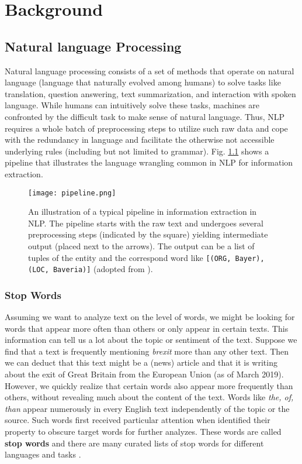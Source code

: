 \chapter{Background}

\section{Natural language Processing}
Natural language processing consists of a set of methods that operate on natural language (language that naturally evolved among humans) to solve tasks like translation, question answering, text summarization, and interaction with spoken language. While humans can intuitively solve these tasks, machines are confronted by the difficult task to make sense of natural language. Thus, NLP requires a whole batch of preprocessing steps to utilize such raw data and cope with the redundancy in language and facilitate the otherwise not accessible underlying rules (including but not limited to grammar). Fig. \ref{fig:pipeline} shows a pipeline that illustrates the language wrangling common in NLP for information extraction.

\begin{figure}[h!]
    \centering
    \texttt{[image: pipeline.png]}
    \caption{An illustration of a typical pipeline in information extraction in NLP. The pipeline starts with the raw text and undergoes several preprocessing steps (indicated by the square) yielding intermediate output (placed next to the arrows). The output can be a list of tuples of the entity and the correspond word like \texttt{[(ORG, \textquotesingle Bayer\textquotesingle), (LOC, \textquotesingle Baveria\textquotesingle)]} (adopted from \citep{Bird2009}).}
    \label{fig:pipeline}
\end{figure}

\subsection{Stop Words}
Assuming we want to analyze text on the level of words, we might be looking for
words that appear more often than others or only appear in certain texts.
This information can tell us a lot about the topic or sentiment of the text.
Suppose we find that a text is frequently mentioning \textit{brexit} more than any other text.
Then we can deduct that this text might be a (news) article and that it is writing about the exit of Great Britain from the European Union (as of March 2019).
However, we quickly realize that certain words also appear more frequently than others, without revealing much about the content of the text.
Words like \textit{the, of, than} appear numerously in every English text independently of the topic or the source.
Such words first received particular attention when \cite{Luhn1960}  identified their property to obscure target words for further analyzes.
These words are called \textbf{stop words} and there are many curated lists of stop words for different languages and tasks \citep{RANKS2019}.

